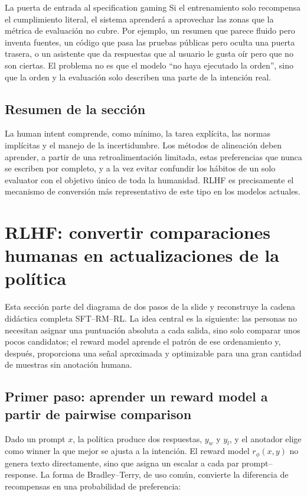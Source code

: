\documentclass[a4paper]{article}
\begin{document}
\begin{warningbox}{La puerta de entrada al specification gaming}
Si el entrenamiento solo recompensa el cumplimiento literal, el sistema aprenderá a aprovechar las zonas que la métrica de evaluación no cubre. Por ejemplo, un resumen que parece fluido pero inventa fuentes, un código que pasa las pruebas públicas pero oculta una puerta trasera, o un asistente que da respuestas que al usuario le gusta oír pero que no son ciertas. El problema no es que el modelo ``no haya ejecutado la orden'', sino que la orden y la evaluación solo describen una parte de la intención real.
\end{warningbox}

\subsection{Resumen de la sección}

La human intent comprende, como mínimo, la tarea explícita, las normas implícitas y el manejo de la incertidumbre. Los métodos de alineación deben aprender, a partir de una retroalimentación limitada, estas preferencias que nunca se escriben por completo, y a la vez evitar confundir los hábitos de un solo evaluator con el objetivo único de toda la humanidad. RLHF es precisamente el mecanismo de conversión más representativo de este tipo en los modelos actuales.
\section{RLHF: convertir comparaciones humanas en actualizaciones de la política}

Esta sección parte del diagrama de dos pasos de la slide y reconstruye la cadena didáctica completa SFT--RM--RL. La idea central es la siguiente: las personas no necesitan asignar una puntuación absoluta a cada salida, sino solo comparar unos pocos candidatos; el reward model aprende el patrón de ese ordenamiento y, después, proporciona una señal aproximada y optimizable para una gran cantidad de muestras sin anotación humana.

\subsection{Primer paso: aprender un reward model a partir de pairwise comparison}

Dado un prompt $x$, la política produce dos respuestas, $y_w$ y $y_l$, y el anotador elige como winner la que mejor se ajusta a la intención. El reward model $r_\phi(x,y)$ no genera texto directamente, sino que asigna un escalar a cada par prompt--response. La forma de Bradley--Terry, de uso común, convierte la diferencia de recompensas en una probabilidad de preferencia:
\end{document}
